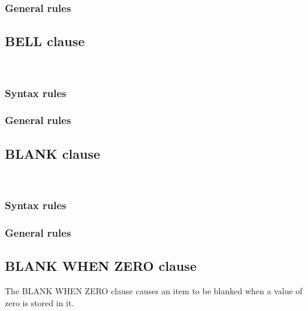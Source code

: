 \subsubsection{General rules}

\subsection{BELL clause}

\begin{syntax}
  \begin{1=}
     \\
  \end{1=}
\end{syntax}

\subsubsection{Syntax rules}

\subsubsection{General rules}

\subsection{BLANK clause}

\begin{syntax}
  \begin{1=}
     \\
  \end{1=}
\end{syntax}

\subsubsection{Syntax rules}

\subsubsection{General rules}

\subsection{BLANK WHEN ZERO clause}

The BLANK WHEN ZERO clause causes an item to be blanked when a value of zero is stored in it.

